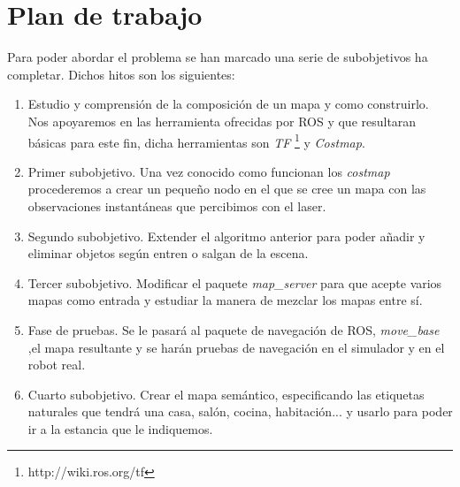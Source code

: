 \section{Plan de trabajo}
\label{sec:plandetrabajo}

Para poder abordar el problema se han marcado una serie de subobjetivos ha completar. Dichos hitos son los siguientes:

\begin{enumerate}
\item Estudio y comprensión de la composición de un mapa y como construirlo. Nos apoyaremos en las herramienta ofrecidas por ROS y que resultaran básicas para este fin, dicha herramientas son \textit{TF} \footnote{http://wiki.ros.org/tf} y \textit{Costmap}\footnotemark .
\item Primer subobjetivo. Una vez conocido como funcionan los \textit{costmap} procederemos a crear un pequeño nodo en el que se cree un mapa con las observaciones instantáneas que percibimos con el laser.
\item Segundo subobjetivo. Extender el algoritmo anterior para poder añadir y eliminar objetos según entren o salgan de la escena.
\item Tercer subobjetivo. Modificar el paquete \textit{map\_server} para que acepte varios mapas como entrada y estudiar la manera de mezclar los mapas entre sí.
\item Fase de pruebas. Se le pasará al paquete de navegación de ROS, \textit{move\_base} ,el mapa resultante y se harán pruebas de navegación en el simulador y en el robot real.
\item Cuarto subobjetivo. Crear el mapa semántico, especificando las etiquetas naturales que tendrá una casa, salón, cocina, habitación... y usarlo para poder ir a la estancia que le indiquemos.

\end{enumerate}
